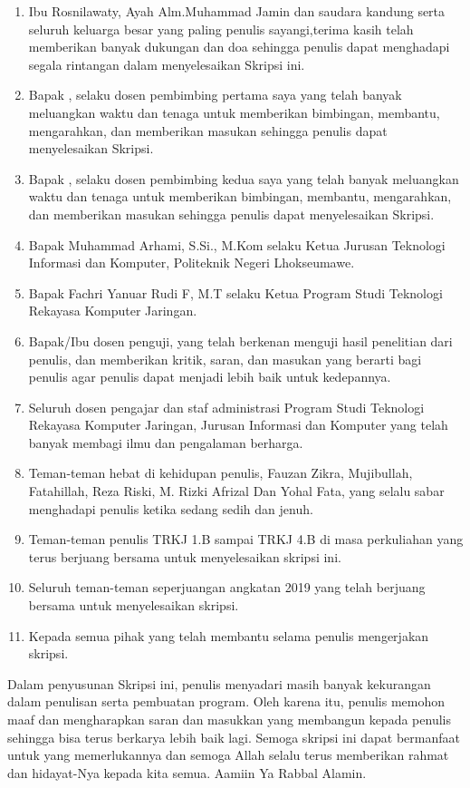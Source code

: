 \begin{enumerate}
    \item Ibu Rosnilawaty, Ayah Alm.Muhammad Jamin dan saudara kandung serta seluruh keluarga besar yang paling penulis sayangi,terima kasih telah memberikan banyak 
    dukungan dan doa sehingga penulis dapat menghadapi segala rintangan 
    dalam menyelesaikan Skripsi ini.
    \item Bapak \pembimbingUtama, selaku dosen pembimbing pertama saya 
    yang telah banyak meluangkan waktu dan tenaga untuk memberikan 
    bimbingan, membantu, mengarahkan, dan memberikan masukan sehingga 
    penulis dapat menyelesaikan Skripsi.
    \item  Bapak \pembimbingPendamping, selaku dosen pembimbing kedua saya yang telah 
    banyak meluangkan waktu dan tenaga untuk memberikan bimbingan, 
    membantu, mengarahkan, dan memberikan masukan sehingga penulis dapat 
    menyelesaikan Skripsi.
    \item Bapak Muhammad Arhami, S.Si., M.Kom selaku Ketua Jurusan Teknologi 
    Informasi dan Komputer, Politeknik Negeri Lhokseumawe.
    \item Bapak Fachri Yanuar Rudi F, M.T selaku Ketua Program Studi Teknologi 
    Rekayasa Komputer Jaringan.
    \item Bapak/Ibu dosen penguji, yang telah berkenan menguji hasil penelitian dari 
    penulis, dan memberikan kritik, saran, dan masukan yang berarti bagi penulis 
    agar penulis dapat menjadi lebih baik untuk kedepannya.
    \item Seluruh dosen pengajar dan staf administrasi Program Studi Teknologi 
    Rekayasa Komputer Jaringan, Jurusan Informasi dan Komputer yang telah 
    banyak membagi ilmu dan pengalaman berharga.
    \item Teman-teman hebat di kehidupan penulis, Fauzan Zikra, Mujibullah, Fatahillah, Reza Riski, M. Rizki Afrizal Dan Yohal Fata, yang 
    selalu sabar menghadapi penulis ketika sedang sedih dan jenuh.
    \item  Teman-teman penulis TRKJ 1.B sampai TRKJ 4.B di masa perkuliahan yang 
    terus berjuang bersama untuk menyelesaikan skripsi ini.
    \item Seluruh teman-teman seperjuangan angkatan 2019 yang telah berjuang 
    bersama untuk menyelesaikan skripsi.
    \item Kepada semua pihak yang telah membantu selama penulis mengerjakan 
    skripsi.
    
\end{enumerate}
\newpage
Dalam penyusunan Skripsi ini, penulis menyadari masih banyak kekurangan 
dalam penulisan serta pembuatan program. Oleh karena itu, penulis memohon 
maaf dan mengharapkan saran dan masukkan yang membangun kepada penulis 
sehingga bisa terus berkarya lebih baik lagi. Semoga skripsi ini dapat bermanfaat 
untuk yang memerlukannya dan semoga Allah selalu terus memberikan rahmat 
dan hidayat-Nya kepada kita semua. Aamiin Ya Rabbal Alamin.

